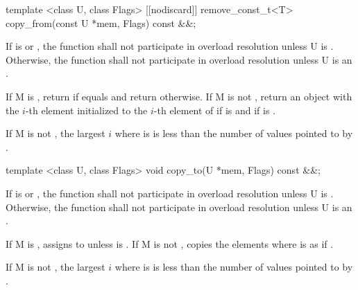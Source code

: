 \begin{itemdecl}
template <class U, class Flags>
[[nodiscard]] remove_const_t<T> copy_from(const U *mem, Flags) const &&;
\end{itemdecl}
\begin{itemdescr}
  \pnum\remarks If  is \bool or , the function shall not participate in overload resolution unless \type U is \bool.
  Otherwise, the function shall not participate in overload resolution unless \type U is an \realArithmeticType.

  \pnum\returns If \type M is \bool, return  if  equals \true and return  otherwise.
  If \type M is not \bool, return an object with the $i$-th element initialized to the $i$-th element of  if  is \false and  if  is \true \foralli[M::].

  \pnum\requires If \type M is not \bool, the largest $i$ where  is \true is less than the number of values pointed to by .

\end{itemdescr}

\begin{itemdecl}
template <class U, class Flags> void copy_to(U *mem, Flags) const &&;
\end{itemdecl}
\begin{itemdescr}
  \pnum\remarks If  is \bool or , the function shall not participate in overload resolution unless \type U is \bool.
  Otherwise, the function shall not participate in overload resolution unless \type U is an \realArithmeticType.

  \pnum\effects If \type M is \bool, assigns  to  unless  is \false.
  If \type M is not \bool, copies the elements  where  is \true as if  \foralli[M::].

  \pnum\requires If \type M is not \bool, the largest $i$ where  is \true is less than the number of values pointed to by .

\end{itemdescr}

